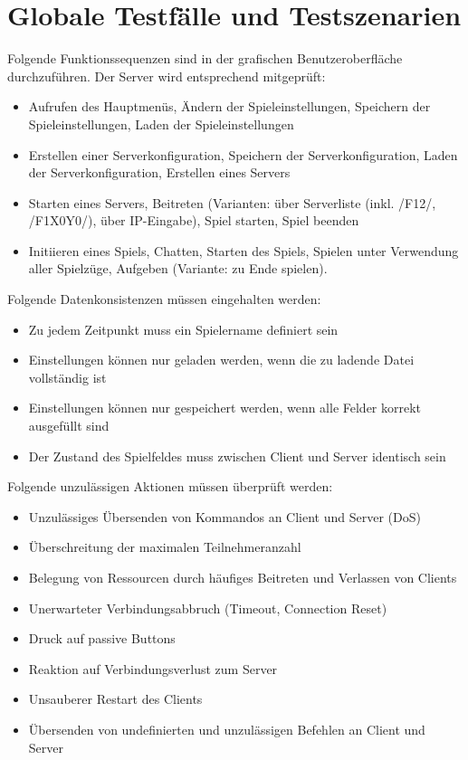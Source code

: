 \documentclass[a4paper,10pt]{article}
\begin{document}
\section{Globale Testfälle und Testszenarien}
Folgende Funktionssequenzen sind in der grafischen Benutzeroberfläche durchzuführen. Der Server wird entsprechend mitgeprüft:
\begin{itemize}
\item Aufrufen des Hauptmenüs, Ändern der Spieleinstellungen, Speichern der Spieleinstellungen, Laden der Spieleinstellungen
\item Erstellen einer Serverkonfiguration, Speichern der Serverkonfiguration, Laden der Serverkonfiguration, Erstellen eines Servers
\item Starten eines Servers, Beitreten (Varianten: über Serverliste (inkl. /F12/, /F1X0Y0/), über IP-Eingabe), Spiel starten, Spiel beenden
\item Initiieren eines Spiels, Chatten, Starten des Spiels, Spielen unter Verwendung aller Spielzüge, Aufgeben (Variante: zu Ende spielen).
\end{itemize}
Folgende Datenkonsistenzen müssen eingehalten werden:
\begin{itemize}
\item Zu jedem Zeitpunkt muss ein Spielername definiert sein
\item Einstellungen können nur geladen werden, wenn die zu ladende Datei vollständig ist
\item Einstellungen können nur gespeichert werden, wenn alle Felder korrekt ausgefüllt sind
\item Der Zustand des Spielfeldes muss zwischen Client und Server identisch sein
\end{itemize}
Folgende unzulässigen Aktionen müssen überprüft werden:
\begin{itemize}
\item Unzulässiges Übersenden von Kommandos an Client und Server (DoS)
\item Überschreitung der maximalen Teilnehmeranzahl
\item Belegung von Ressourcen durch häufiges Beitreten und Verlassen von Clients
\item Unerwarteter Verbindungsabbruch (Timeout, Connection Reset)
\item Druck auf passive Buttons
\item Reaktion auf Verbindungsverlust zum Server
\item Unsauberer Restart des Clients
\item Übersenden von undefinierten und unzulässigen Befehlen an Client und Server
\end{itemize}
\end{document}

